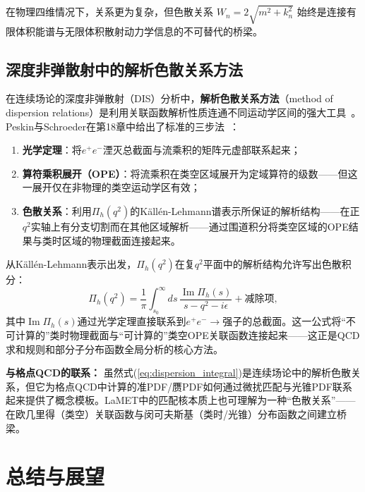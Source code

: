 \documentclass[12pt,a4paper]{ctexart}
\theoremstyle{definition}
\begin{document}
在物理四维情况下，关系更为复杂，但色散关系 $W_n = 2\sqrt{m^2 + k_n^2}$ 始终是连接有限体积能谱与无限体积散射动力学信息的不可替代的桥梁。

\subsection{深度非弹散射中的解析色散关系方法}

在连续场论的深度非弹散射（DIS）分析中，\textbf{解析色散关系方法}（method of dispersion relations）是利用关联函数解析性质连通不同运动学区间的强大工具~\cite{PeskinSchroeder1995}。Peskin与Schroeder在第18章中给出了标准的三步法~\cite{PeskinSchroeder1995}：

\begin{enumerate}[leftmargin=*]
    \item \textbf{光学定理}：将$e^+e^-$湮灭总截面与流乘积的矩阵元虚部联系起来；
    \item \textbf{算符乘积展开（OPE）}：将流乘积在类空区域展开为定域算符的级数——但这一展开仅在非物理的类空运动学区有效；
    \item \textbf{色散关系}：利用$\Pi_h(q^2)$的K\"all\'en-Lehmann谱表示所保证的解析结构——在正$q^2$实轴上有分支切割而在其他区域解析——通过围道积分将类空区域的OPE结果与类时区域的物理截面连接起来。
\end{enumerate}

从K\"all\'en-Lehmann表示出发，$\Pi_h(q^2)$在复$q^2$平面中的解析结构允许写出色散积分：
\begin{equation}\label{eq:dispersion_integral}
    \Pi_h(q^2) = \frac{1}{\pi} \int_{s_0}^\infty ds\,\frac{\operatorname{Im}\Pi_h(s)}{s - q^2 - i\epsilon} + \text{减除项},
\end{equation}
其中$\operatorname{Im}\Pi_h(s)$通过光学定理直接联系到$e^+e^- \to \text{强子}$的总截面。这一公式将``不可计算的''类时物理截面与``可计算的''类空OPE关联函数连接起来——这正是QCD求和规则和部分子分布函数全局分析的核心方法。

\textbf{与格点QCD的联系：} 虽然式(\ref{eq:dispersion_integral})是连续场论中的解析色散关系，但它为格点QCD中计算的准PDF/赝PDF如何通过微扰匹配与光锥PDF联系起来提供了概念模板。LaMET中的匹配核本质上也可理解为一种``色散关系''——在欧几里得（类空）关联函数与闵可夫斯基（类时/光锥）分布函数之间建立桥梁。

\section{总结与展望}
\end{document}
